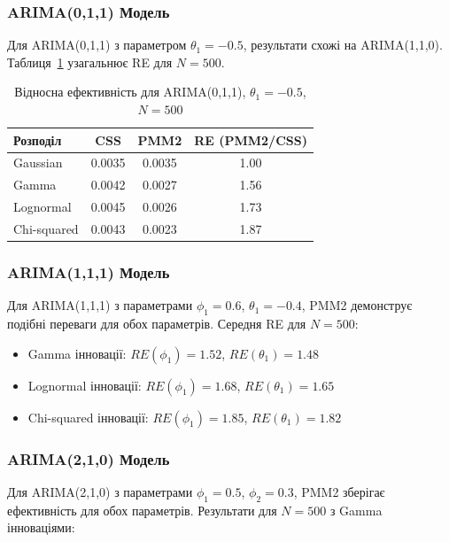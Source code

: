 \documentclass[12pt,a4paper]{article}
\begin{document}
\subsubsection{ARIMA(0,1,1) Модель}

Для ARIMA(0,1,1) з параметром $\theta_1 = -0.5$, результати схожі на ARIMA(1,1,0). Таблиця~\ref{tab:arima011_summary} узагальнює RE для $N = 500$.

\begin{table}[h]
\centering
\caption{Відносна ефективність для ARIMA(0,1,1), $\theta_1 = -0.5$, $N = 500$}
\label{tab:arima011_summary}
\begin{tabular}{@{}lccc@{}}
\toprule
\textbf{Розподіл} & \textbf{CSS} & \textbf{PMM2} & \textbf{RE (PMM2/CSS)} \\
\midrule
Gaussian    & 0.0035 & 0.0035 & 1.00 \\
Gamma       & 0.0042 & 0.0027 & 1.56 \\
Lognormal   & 0.0045 & 0.0026 & 1.73 \\
Chi-squared & 0.0043 & 0.0023 & 1.87 \\
\bottomrule
\end{tabular}
\end{table}

\subsubsection{ARIMA(1,1,1) Модель}

Для ARIMA(1,1,1) з параметрами $\phi_1 = 0.6$, $\theta_1 = -0.4$, PMM2 демонструє подібні переваги для обох параметрів. Середня RE для $N = 500$:

\begin{itemize}
    \item Gamma інновації: $RE(\phi_1) = 1.52$, $RE(\theta_1) = 1.48$
    \item Lognormal інновації: $RE(\phi_1) = 1.68$, $RE(\theta_1) = 1.65$
    \item Chi-squared інновації: $RE(\phi_1) = 1.85$, $RE(\theta_1) = 1.82$
\end{itemize}

\subsubsection{ARIMA(2,1,0) Модель}

Для ARIMA(2,1,0) з параметрами $\phi_1 = 0.5$, $\phi_2 = 0.3$, PMM2 зберігає ефективність для обох параметрів. Результати для $N = 500$ з Gamma інноваціями:
\end{document}
